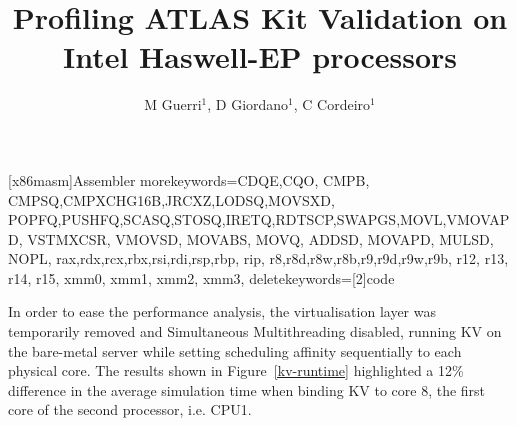 \documentclass[a4paper]{jpconf}
\begin{document}
\title{Profiling ATLAS Kit Validation on \newline Intel Haswell-EP processors}

\author{M Guerri$^1$, D Giordano$^1$, C Cordeiro$^1$}
\address{$^1$ CERN}


   [x86masm]{Assembler}
   {morekeywords={CDQE,CQO, CMPB, CMPSQ,CMPXCHG16B,JRCXZ,LODSQ,MOVSXD,
                  POPFQ,PUSHFQ,SCASQ,STOSQ,IRETQ,RDTSCP,SWAPGS,MOVL,VMOVAPD,
                  VSTMXCSR, VMOVSD, MOVABS, MOVQ, ADDSD, MOVAPD, MULSD, NOPL,
                  rax,rdx,rcx,rbx,rsi,rdi,rsp,rbp, rip,
                  r8,r8d,r8w,r8b,r9,r9d,r9w,r9b, r12, r13, r14, r15,
                  xmm0, xmm1, xmm2, xmm3},
    deletekeywords=[2]{code}
    }
\newcommand\realnumberstyle[1]{}

\makeatletter
\newcommand{\zebra}[3]{%
    {\realnumberstyle{#3}}%
    \begingroup
    \lst@basicstyle
    \ifodd\value{lstnumber}%
        \color{#1}%
    \else
        \color{#2}%
    \fi
        \rlap{\hspace*{\lst@numbersep}%
        \color@block{\linewidth}{\ht\strutbox}{\dp\strutbox}%
        }%
    \endgroup
}
\makeatother




In order to ease the performance analysis, the virtualisation layer was
temporarily removed and Simultaneous Multithreading disabled, running KV on 
the bare-metal server while setting scheduling affinity sequentially to each physical
core. The results shown
in Figure~\ref{kv-runtime} highlighted a 12\% difference in the average simulation
time when binding KV to core 8, the first core of the second processor, i.e. CPU1.
\end{document}
